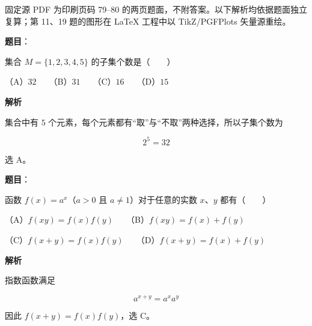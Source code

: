 

\begin{gktip}
固定源 PDF 为印刷页码 79–80 的两页题面，不附答案。以下解析均依据题面独立复算；第 11、19 题的图形在 LaTeX 工程中以 TikZ/PGFPlots 矢量源重绘。
\end{gktip}


\begin{answer}

\textbf{题目}：

集合 $M=\{1,2,3,4,5\}$ 的子集个数是\mbox{（　　）}

（A）$32$　　（B）$31$　　（C）$16$　　（D）$15$

\textbf{解析}

集合中有 $5$ 个元素，每个元素都有“取”与“不取”两种选择，所以子集个数为

\nopagebreak[4]
\[
2^5=32
\]

选 A。


\end{answer}
\begin{answer}

\textbf{题目}：

函数 $f(x)=a^x$（$a>0$ 且 $a\ne1$）对于任意的实数 $x\text{、}y$ 都有\mbox{（　　）}

（A）$f(xy)=f(x)f(y)$　　（B）$f(xy)=f(x)+f(y)$

（C）$f(x+y)=f(x)f(y)$　　（D）$f(x+y)=f(x)+f(y)$

\textbf{解析}

指数函数满足

\nopagebreak[4]
\[
a^{x+y}=a^xa^y
\]

因此 $f(x+y)=f(x)f(y)$，选 C。


\end{answer}
